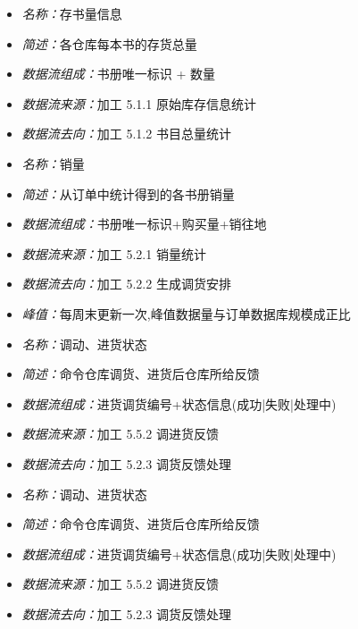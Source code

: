 \documentclass{article}
\begin{document}
\begin{CJK*}{UTF8}{gbsn}
\vspace{-1mm}

\begin{itemize}
\item \textit{名称：}存书量信息
	\item \textit{简述：}各仓库每本书的存货总量
	\item \textit{数据流组成：}书册唯一标识 + 数量
	\item \textit{数据流来源：}加工 5.1.1 原始库存信息统计
	\item \textit{数据流去向：}加工 5.1.2 书目总量统计
\end{itemize}

\vspace{-1mm}

\begin{itemize}
\item \textit{名称：}销量
	\item \textit{简述：}从订单中统计得到的各书册销量
	\item \textit{数据流组成：}书册唯一标识+购买量+销往地
	\item \textit{数据流来源：}加工 5.2.1 销量统计
	\item \textit{数据流去向：}加工 5.2.2 生成调货安排
	\item \textit{峰值：}每周末更新一次,峰值数据量与订单数据库规模成正比
\end{itemize}

\vspace{-1mm}

\begin{itemize}
\item \textit{名称：}调动、进货状态
	\item \textit{简述：}命令仓库调货、进货后仓库所给反馈
	\item \textit{数据流组成：}进货调货编号+状态信息(成功|失败|处理中)
	\item \textit{数据流来源：}加工 5.5.2 调进货反馈
	\item \textit{数据流去向：}加工 5.2.3 调货反馈处理
\end{itemize}

\vspace{-1mm}

\begin{itemize}
\item \textit{名称：}调动、进货状态
	\item \textit{简述：}命令仓库调货、进货后仓库所给反馈
	\item \textit{数据流组成：}进货调货编号+状态信息(成功|失败|处理中)
	\item \textit{数据流来源：}加工 5.5.2 调进货反馈
	\item \textit{数据流去向：}加工 5.2.3 调货反馈处理
\end{itemize}


\end{CJK*}
\end{document}
